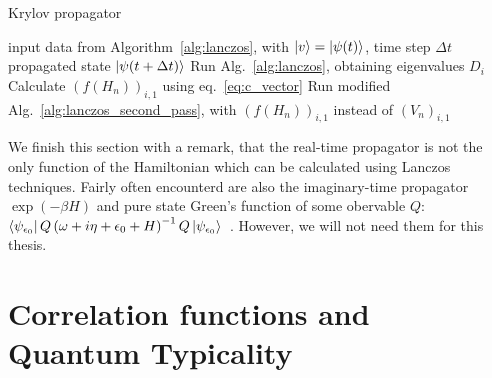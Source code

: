 \begin{algorithm}
	\algrenewcommand{}
	\algrenewcommand{}
	\caption{Krylov propagator}
	\label{alg:krylov_propagator}
	\begin{algorithmic}[1]
		\Require input data from Algorithm~\ref{alg:lanczos}, with \(\ket{v} = \ket{\psi(t)}\), time step \(\Delta t\)
		\Ensure propagated state \(\ket{\psi(t+\Delta t)}\)
		\State Run Alg.~\ref{alg:lanczos}, obtaining eigenvalues \(D_i\)
		\State Calculate \(\left(f(H_n)\right)_{i,1}\) using eq.~\eqref{eq:c_vector}
		\State Run modified Alg.~\ref{alg:lanczos_second_pass}, with \(\left(f(H_n)\right)_{i,1}\) instead of \(\left(V_n\right)_{i,1}\)
	\end{algorithmic}
\end{algorithm}

We finish this section with a remark, that the real-time propagator is not the only function of the Hamiltonian which can
be calculated using Lanczos techniques. Fairly often encounterd are also the imaginary-time propagator \(\exp\left(-\beta H\right)\)
and pure state Green's function of some obervable \(Q\): \(\bra{\psi_{\epsilon_0}} Q \left(\omega + i\eta +\epsilon_0
+ H \right)^{-1} Q \ket{\psi_{\epsilon_0}}\)~\autocite{Dagotto1994}. However, we will not need them for this thesis.


\section{Correlation functions and Quantum Typicality}

